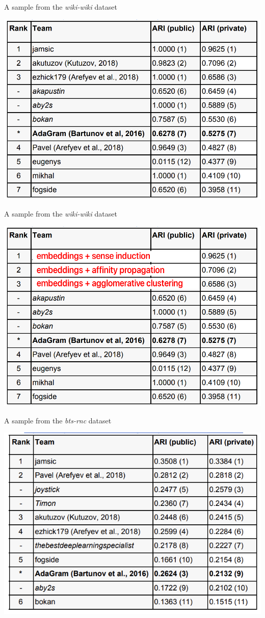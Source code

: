 \begin{frame}{A sample from the \textit{wiki-wiki} dataset }

{\centering
\includegraphics[width=.8\textwidth]{figures/wiki-wiki}
}	
\end{frame}



\begin{frame}{A sample from the \textit{wiki-wiki} dataset }

{\centering
\includegraphics[width=.8\textwidth]{figures/wiki-wiki-top}
}	
\end{frame}



\begin{frame}{A sample from the \textit{bts-rnc} dataset }

{\centering
\includegraphics[width=.8\textwidth]{figures/bts}
}	
\end{frame}



